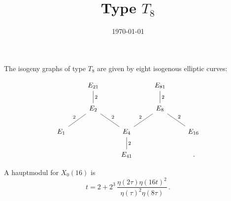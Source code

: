 \documentclass[11pt]{article}
\theoremstyle{definition}
\begin{document}
\title{Type $T_8$}
\date{\today}
\maketitle

 The isogeny graphs of type $T_8$ are given by
eight isogenous elliptic curves:

\[ \begin{tikzcd}
& E_{21} \ar[dash,d,"2"] & & E_{81} \ar[dash,d,"2"] & \\
& E_{2} \ar[dash,swap,dl,"2"] \ar[dash,dr,"2"] & & E_{8} \ar[dash,dl,swap,"2"] \ar[dash,dr,"2"] & \\
 E_1 &  & E_4 \ar[dash,d,"2"] & & E_{16}  \\
 &  & E_{41} & &    \,.
\end{tikzcd}
\]

 A hauptmodul for $X_0(16)$ is  
$$
t = 2 + 2^3 \, \displaystyle{\frac{\eta(2\tau) \eta(16t)^2}{\eta(\tau)^2 \eta(8\tau)}}\,.
$$
\end{document}

